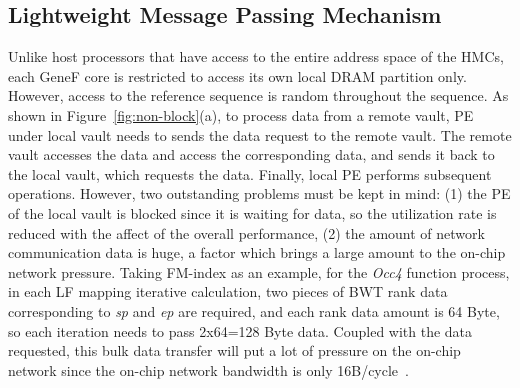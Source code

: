 \documentclass[9pt,conference]{IEEEtran}
\begin{document}


\subsection{Lightweight Message Passing Mechanism}
\label{sec:arch:message}
Unlike host processors that have access to the entire address space of the HMCs, each GeneF core is restricted to access its own local DRAM partition only. However, access to the reference sequence is random throughout the sequence. As shown in Figure~\ref{fig:non-block}(a), to process data from a remote vault, PE under local vault needs to sends the data request to the remote vault. The remote vault accesses the data and access the corresponding data, and sends it back to the local vault, which requests the data. Finally, local PE performs subsequent operations. However, two outstanding problems must be kept in mind: (1) the PE of the local vault is blocked since it is waiting for data, so the utilization rate is reduced with the affect of the overall performance, (2) the amount of network communication data is huge, a factor which brings a large amount to the on-chip network pressure. Taking FM-index as an example, for the \textit{Occ4} function process, in each LF mapping iterative calculation, two pieces of BWT rank data corresponding to \textit{sp} and \textit{ep} are required, and each rank data amount is 64 Byte, so each iteration needs to pass 2x64=128 Byte data. Coupled with the data requested, this bulk data transfer will put a lot of pressure on the on-chip network since the on-chip network bandwidth is only 16B/cycle~\cite{gao2015practical}.
\end{document}
